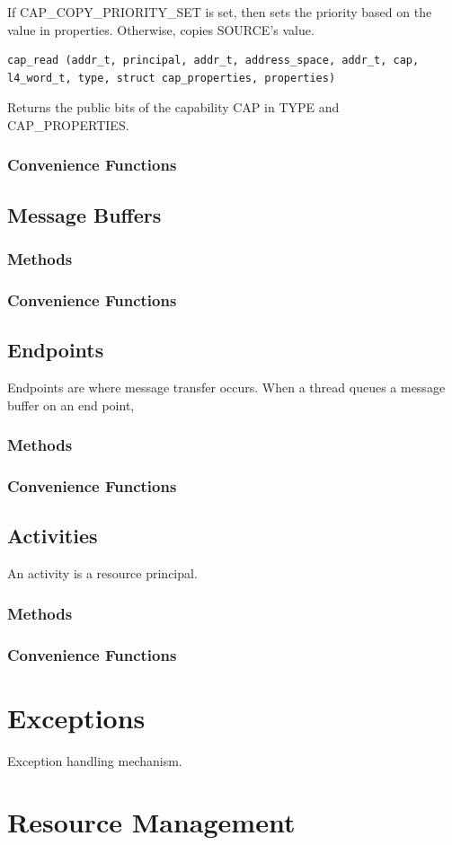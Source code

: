 If CAP\_COPY\_PRIORITY\_SET is set, then sets the priority based on
the value in properties.  Otherwise, copies SOURCE's value.


\begin{lstlisting}
cap_read (addr_t, principal, addr_t, address_space, addr_t, cap,
l4_word_t, type, struct cap_properties, properties)
\end{lstlisting}

Returns the public bits of the capability CAP in TYPE and
CAP\_PROPERTIES.

\subsection{Convenience Functions}

\clearpage
\section{Message Buffers}

\subsection{Methods}

\subsection{Convenience Functions}

\clearpage
\section{Endpoints}

Endpoints are where message transfer occurs.  When a thread queues a
message buffer on an end point, 

\subsection{Methods}

\subsection{Convenience Functions}

\clearpage
\section{Activities}

An activity is a resource principal.

\subsection{Methods}

\subsection{Convenience Functions}

\chapter{Exceptions}

Exception handling mechanism.

\chapter{Resource Management}
